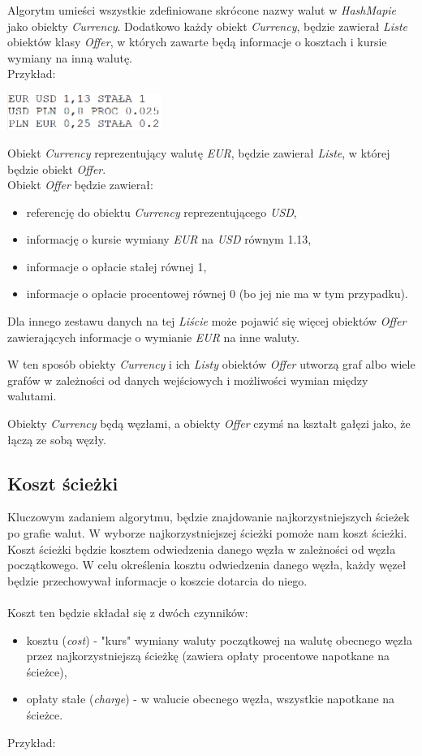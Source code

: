 \documentclass[a4paper,11pt]{article}
\begin{document}
Algorytm umieści wszystkie zdefiniowane skrócone nazwy walut w \textit{HashMapie} jako obiekty \textit{Currency}. Dodatkowo każdy obiekt \textit{Currency}, będzie zawierał \textit{Liste} obiektów klasy \textit{Offer}, w których zawarte będą informacje o kosztach i kursie wymiany na inną walutę.
\\Przykład:
\begin{center}
\includegraphics[width = 5cm]{Przyklad}
\end{center}

Obiekt \textit{Currency} reprezentujący walutę \textit{EUR}, będzie zawierał \textit{Liste}, w której będzie obiekt \textit{Offer}.
\\Obiekt \textit{Offer} będzie zawierał:
\begin{itemize}
\item referencję do obiektu \textit{Currency} reprezentującego \textit{USD},
\item informację o kursie wymiany \textit{EUR} na \textit{USD} równym 1.13,
\item informacje o opłacie stałej równej 1,
\item informacje o opłacie procentowej równej 0 (bo jej nie ma w tym przypadku).
\end{itemize} 

Dla innego zestawu danych na tej \textit{Liście} może pojawić się więcej obiektów \textit{Offer} zawierających informacje o wymianie \textit{EUR} na inne waluty.

W ten sposób obiekty \textit{Currency} i ich \textit{Listy} obiektów \textit{Offer} utworzą graf albo wiele grafów w zależności od danych wejściowych i możliwości wymian między walutami.

Obiekty \textit{Currency} będą węzłami, a obiekty \textit{Offer} czymś na kształt gałęzi jako, że łączą ze sobą węzły.

\subsection{Koszt ścieżki}
Kluczowym zadaniem algorytmu, będzie znajdowanie najkorzystniejszych ścieżek po grafie walut. W wyborze najkorzystniejszej ścieżki pomoże nam koszt ścieżki.
Koszt ścieżki będzie kosztem odwiedzenia danego węzła w zależności od węzła początkowego. W celu określenia kosztu odwiedzenia danego węzła, każdy węzeł będzie przechowywał informacje o koszcie dotarcia do niego.
\\\\Koszt ten będzie składał się z dwóch czynników:
\begin{itemize}
\item kosztu (\textit{cost}) - "kurs" wymiany waluty początkowej na walutę obecnego węzła przez najkorzystniejszą ścieżkę (zawiera opłaty procentowe napotkane na ścieżce),
\item opłaty stałe (\textit{charge}) - w walucie obecnego węzła, wszystkie napotkane na ścieżce.
\end{itemize}
Przykład:
\end{document}
